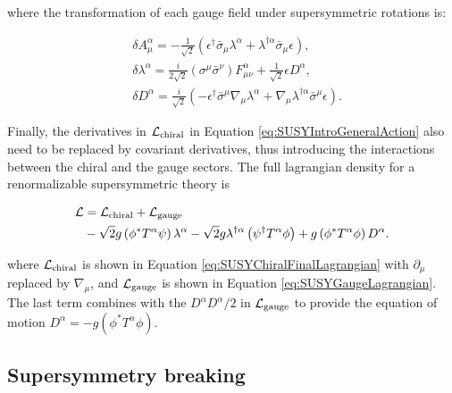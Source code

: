 \noindent where the transformation of each gauge field under supersymmetric rotations is:

\begin{equation}
\begin{split}
& \delta A_\mu^\alpha = -\frac{1}{\sqrt{2}}\left(\epsilon^{\dagger}\bar{\sigma}_\mu\lambda^{\alpha} + \lambda^{\dagger\alpha}\bar{\sigma}_\mu\epsilon \right), \\
& \delta \lambda^\alpha = \frac{i}{2\sqrt{2}} \left(\sigma^\mu \bar{\sigma}^\nu\right) F^\alpha_{\mu\nu} + \frac{1}{\sqrt{2}}\epsilon D^\alpha, \\
&\delta D^\alpha = \frac{i}{\sqrt{2}}\left( -\epsilon^{\dagger}\bar{\sigma}^\mu\nabla_\mu\lambda^\alpha + \nabla_\mu\lambda^{\dagger\alpha}\bar{\sigma}^\mu\epsilon \right).
\end{split}
\label{eq:SUSYGaugeTransformationSUSY}
\end{equation}

Finally, the derivatives in $\mathcal{L}_{\text{chiral}}$ in Equation \ref{eq:SUSYIntroGeneralAction} also need to be replaced by covariant derivatives, thus introducing the interactions between the chiral and the gauge sectors.
The full lagrangian density for a renormalizable supersymmetric theory is

\begin{equation}
\begin{split}
\lagrangian &= \lagrangian_{\text{chiral}} + \lagrangian_{\text{gauge}} \\
& -\sqrt{2}g\left(\phi^{\ast}T^\alpha\psi\right)\lambda^\alpha - \sqrt{2}g\lambda^{\dagger\alpha} \left(\psi^\dagger T^\alpha\phi\right) + g\left(\phi^{\ast}T^\alpha\phi\right)D^\alpha.
\end{split}
\label{eq:SUSYFullLagrangianGeneral}
\end{equation}

\noindent where $\mathcal{L}_{\text{chiral}}$ is shown in Equation \ref{eq:SUSYChiralFinalLagrangian} with $\partial_\mu$ replaced by $\nabla_\mu$, and $\mathcal{L}_{\text{gauge}}$ is shown in Equation \ref{eq:SUSYGaugeLagrangian}.
The last term combines with the $D^\alpha D^\alpha / 2$ in $\mathcal{L}_{\text{gauge}}$ to provide the equation of motion $D^\alpha = -g(\phi^{\ast} T^\alpha \phi)$.


\subsection{Supersymmetry breaking}

